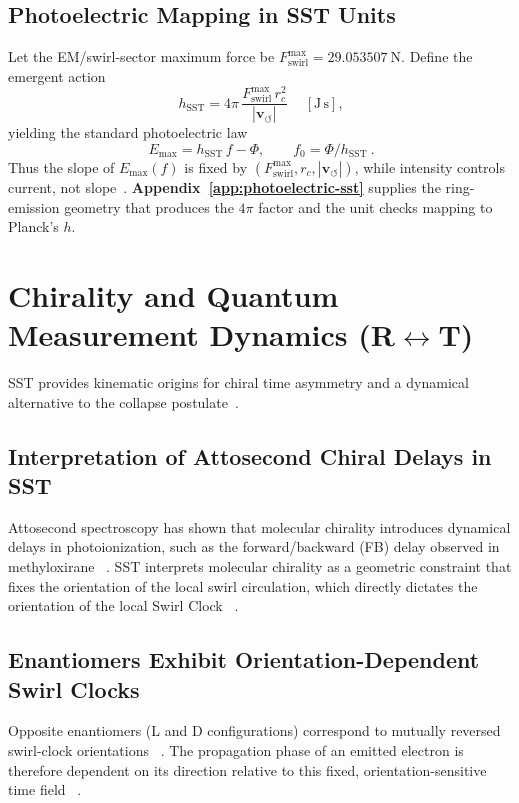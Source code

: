 \documentclass[10pt,reprint,aps,onecolumn,nofootinbib]{revtex4-2}
\begin{document}
\subsection*{Photoelectric Mapping in SST Units}\label{subsec:photoelectric-sst}
    Let the EM/swirl-sector maximum force be \(F_{\text{swirl}}^{\max}=29.053507~\mathrm{N}\).
    Define the emergent action
    \[
        \boxed{~
        h_{\mathrm{SST}}=4\pi\,\frac{F_{\text{swirl}}^{\max}\,r_c^{2}}{|\mathbf{v}_{\!\boldsymbol{\circlearrowleft}}|}
        ~}\quad [\mathrm{J\,s}],
    \]
    yielding the standard photoelectric law
    \[
        \boxed{~ E_{\max}=h_{\mathrm{SST}}\,f-\Phi,\qquad f_{0}=\Phi/h_{\mathrm{SST}} ~}.
    \]
    Thus the slope of \(E_{\max}(f)\) is fixed by \((F_{\text{swirl}}^{\max}, r_c, |\mathbf{v}_{\!\boldsymbol{\circlearrowleft}}|)\), while intensity controls current, not slope~\cite{Einstein1905}.
    \textbf{Appendix~\ref{app:photoelectric-sst}} supplies the ring-emission geometry that produces the \(4\pi\) factor and the unit checks mapping to Planck’s \(h\).


\section{Chirality and Quantum Measurement Dynamics (R\texorpdfstring{$\leftrightarrow$}{↔}T)}\label{sec:chirality}
SST provides kinematic origins for chiral time asymmetry and a dynamical alternative to the collapse postulate~\cite{sstCanon}.

    \subsection*{Interpretation of Attosecond Chiral Delays in SST}
        Attosecond spectroscopy has shown that molecular chirality introduces dynamical delays in photoionization, such as the forward/backward (FB) delay observed in methyloxirane~ \cite{Nahon2020}. SST interprets molecular chirality as a geometric constraint that fixes the orientation of the local swirl circulation, which directly dictates the orientation of the local Swirl Clock~ \cite{sstAttosecondPhotoionization}.

    \subsection*{Enantiomers Exhibit Orientation-Dependent Swirl Clocks}
        Opposite enantiomers (L and D configurations) correspond to mutually reversed swirl-clock orientations~ \cite{sstAttosecondPhotoionization}. The propagation phase of an emitted electron is therefore dependent on its direction relative to this fixed, orientation-sensitive time field~ \cite{sstAttosecondPhotoionization}.
\end{document}

